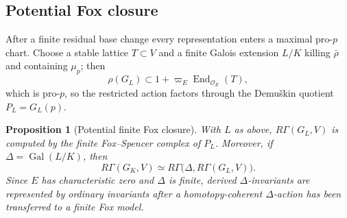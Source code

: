 \documentclass[11pt]{article}
\newtheorem{proposition}[theorem]{Proposition}
\theoremstyle{definition}
\newcommand{\End}{\operatorname{End}}
\newcommand{\Gal}{\operatorname{Gal}}
\begin{document}
\subsection{Potential Fox closure}

After a finite residual base change every representation enters a maximal pro-$p$ chart.  Choose a stable lattice $T\subset V$ and a finite Galois extension $L/K$ killing $\bar\rho$ and containing $\mu_p$; then
\[
\rho(G_L)\subset 1+\varpi_E\End_{\mathcal O_E}(T),
\]
which is pro-$p$, so the restricted action factors through the Demu\v{s}kin quotient $P_L=G_L(p)$.

\begin{proposition}[Potential finite Fox closure]\label{prop:potential-fox-closure}
With $L$ as above, $R\Gamma(G_L,V)$ is computed by the finite Fox--Spencer complex of $P_L$.  Moreover, if $\Delta=\Gal(L/K)$, then
\[
R\Gamma(G_K,V)
\simeq
R\Gamma\bigl(\Delta,R\Gamma(G_L,V)\bigr).
\]
Since $E$ has characteristic zero and $\Delta$ is finite, derived $\Delta$-invariants are represented by ordinary invariants after a homotopy-coherent $\Delta$-action has been transferred to a finite Fox model.
\end{proposition}
\end{document}
